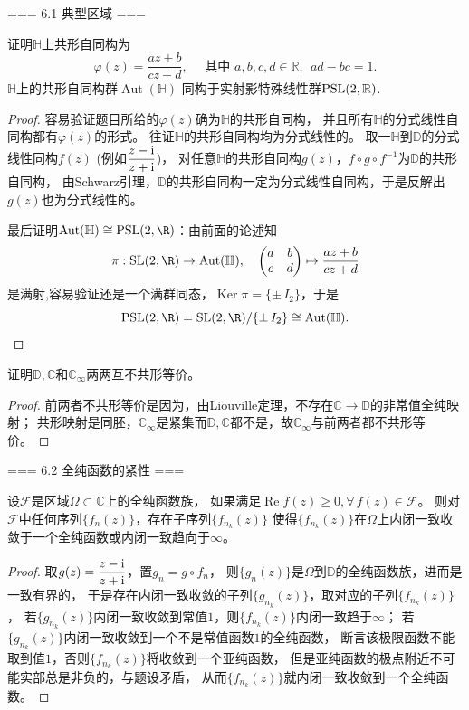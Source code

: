 === 6.1 典型区域 ===
\begin{1}
    证明$\mathbb{H}$上共形自同构为
    \[\varphi(z)=\frac{az+b}{cz+d},
    \quad\text{ 其中 }a,b,c,d\in\mathbb{R},\ \ ad-bc=1.\]
    $\mathbb{H}$上的共形自同构群$\operatorname{Aut}(\mathbb{H})$
    同构于实射影特殊线性群${\rm PSL}(2,\mathbb{R})$.
\end{1}
\begin{proof}
    容易验证题目所给的$\varphi(z)$确为$\mathbb{H}$的共形自同构，
    并且所有$\mathbb{H}$的分式线性自同构都有$\varphi(z)$的形式。
    往证$\mathbb{H}$的共形自同构均为分式线性的。
    取一$\mathbb{H}$到$\mathbb{D}$的分式线性同构$f(z)$ (例如$\dfrac{z-{\rm i}}{z+{\rm i}}$)，
    对任意$\mathbb{H}$的共形自同构$g(z)$，$f\circ g\circ f^{-1}$为$\mathbb{D}$的共形自同构，
    由Schwarz引理，$\mathbb{D}$的共形自同构一定为分式线性自同构，于是反解出$g(z)$也为分式线性的。

    最后证明$\operatorname{Aut}(\mathbb{H})\cong{\rm PSL}(2,\R)$：由前面的论述知
    \[\pi:{\rm SL}(2,\R)\to\operatorname{Aut}(\mathbb{H}),
    \quad\begin{pmatrix}a&b\\c&d\end{pmatrix}\mapsto\frac{az+b}{cz+d}\]
    是满射,容易验证还是一个满群同态，$\operatorname{Ker}\pi=\{\pm\,I_2\}$，于是
    \[{\rm PSL}(2,\R)={\rm SL}(2,\R)/\{\pm\,I_2\}
    \cong\operatorname{Aut}(\mathbb{H}).\qedhere\]
\end{proof}

\begin{2}
    证明$\mathbb{D},\mathbb{C}$和$\mathbb{C}_\infty$两两互不共形等价。
\end{2}
\begin{proof}
    前两者不共形等价是因为，由Liouville定理，不存在$\mathbb{C}\to\mathbb{D}$的非常值全纯映射；
    共形映射是同胚，$\mathbb{C}_\infty$是紧集而$\mathbb{D},\mathbb{C}$都不是，故$\mathbb{C}_\infty$与前两者都不共形等价。
\end{proof}

=== 6.2 全纯函数的紧性 ===
\begin{1}
    设$\mathcal{F}$是区域$\Omega\subset\mathbb{C}$上的全纯函数族，
    如果满足$\operatorname{Re}f(z)\geq0,\forall\,f(z)\in\mathcal{F}$。
    则对$\mathcal{F}$中任何序列$\{f_n(z)\}$，存在子序列$\{f_{n_k}(z)\}$
    使得$\{f_{n_k}(z)\}$在$\Omega$上内闭一致收敛于一个全纯函数或内闭一致趋向于$\infty$。
\end{1}
\begin{proof}
    取$g(z)=\dfrac{z-{\rm i}}{z+{\rm i}}$，置$g_n=g\circ f_n$，
    则$\{g_n(z)\}$是$\Omega$到$\mathbb{D}$的全纯函数族，进而是一致有界的，
    于是存在内闭一致收敛的子列$\{g_{n_k}(z)\}$，取对应的子列$\{f_{n_k}(z)\}$，
    若$\{g_{n_k}(z)\}$内闭一致收敛到常值$1$，则$\{f_{n_k}(z)\}$内闭一致趋于$\infty$；
    若$\{g_{n_k}(z)\}$内闭一致收敛到一个不是常值函数$1$的全纯函数，
    断言该极限函数不能取到值$1$，否则$\{f_{n_k}(z)\}$将收敛到一个亚纯函数，
    但是亚纯函数的极点附近不可能实部总是非负的，与题设矛盾，
    从而$\{f_{n_k}(z)\}$就内闭一致收敛到一个全纯函数。
\end{proof}


